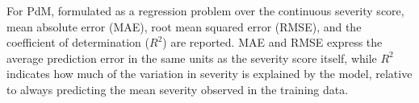 For PdM, formulated as a regression problem over the continuous severity score, 
mean absolute error (MAE), root mean squared error (RMSE), and the 
coefficient of determination ($R^2$) are reported. MAE and RMSE express the average prediction error in 
the same units as the severity score itself, while $R^2$ indicates how much of the variation in severity 
is explained by the model, relative to always predicting the mean severity observed in the training data.